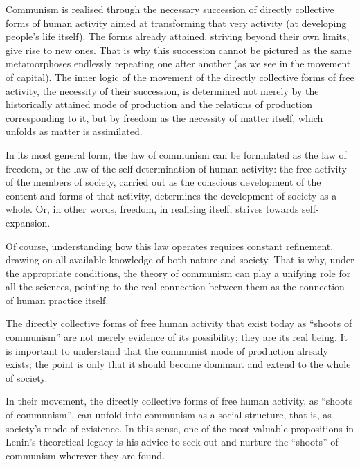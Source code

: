 \documentclass[../main]{subfiles}
\begin{document}
Communism is realised through the necessary succession of directly collective forms of human activity aimed at transforming that very activity (at developing people’s life itself). The forms already attained, striving beyond their own limits, give rise to new ones. That is why this succession cannot be pictured as the same metamorphoses endlessly repeating one after another (as we see in the movement of capital). The inner logic of the movement of the directly collective forms of free activity, the necessity of their succession, is determined not merely by the historically attained mode of production and the relations of production corresponding to it, but by freedom as the necessity of matter itself, which unfolds as matter is assimilated.

In its most general form, the law of communism can be formulated as the law of freedom, or the law of the self-determination of human activity: the free activity of the members of society, carried out as the conscious development of the content and forms of that activity, determines the development of society as a whole. Or, in other words, freedom, in realising itself, strives towards self-expansion.

Of course, understanding how this law operates requires constant refinement, drawing on all available knowledge of both nature and society. That is why, under the appropriate conditions, the theory of communism can play a unifying role for all the sciences, pointing to the real connection between them as the connection of human practice itself.

The directly collective forms of free human activity that exist today as “shoots of communism” are not merely evidence of its possibility; they are its real being. It is important to understand that the communist mode of production already exists; the point is only that it should become dominant and extend to the whole of society.

In their movement, the directly collective forms of free human activity, as “shoots of communism”, can unfold into communism as a social structure, that is, as society’s mode of existence. In this sense, one of the most valuable propositions in Lenin’s theoretical legacy is his advice to seek out and nurture the “shoots” of communism wherever they are found.
\end{document}
